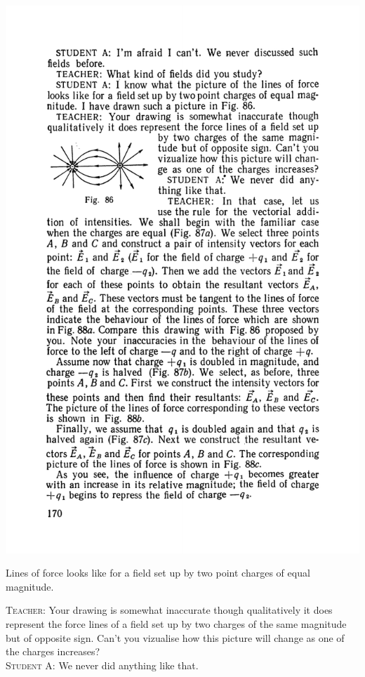 \documentclass[a4paper,sfsidenotes]{tufte-book}
\begin{document}
\begin{marginfigure}%
\centering
\includegraphics[width=\linewidth]{fig-086a}
\caption{Lines of force looks like for a field set up by two point charges of equal magnitude.}
\label{fig-86}
\end{marginfigure}
\textsc{Teacher:} Your drawing is somewhat inaccurate though qualitatively it does represent the force lines of a field set up by two charges of the same magnitude but of opposite sign. Can't you vizualise how this picture will change as one of the charges increases?
\\
\textsc{Student A:} We never did anything like that.
\\
\end{document}
